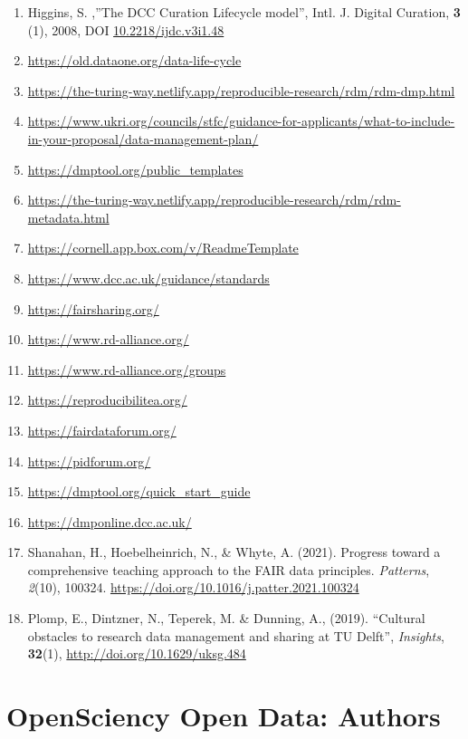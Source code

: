 \documentclass[
  letterpaper,
  DIV=11,
  numbers=noendperiod]{scrreport}
\providecommand{\tightlist}{%
  \setlength{\itemsep}{0pt}\setlength{\parskip}{0pt}}\usepackage{longtable,booktabs,array}
\begin{document}
\begin{enumerate}
\def\labelenumi{\arabic{enumi}.}
\tightlist
\item
  Higgins, S. ,''The DCC Curation Lifecycle model'', Intl. J. Digital
  Curation, \textbf{3} (1), 2008, DOI
  \href{https://doi.org/10.2218/ijdc.v3i1.48}{10.2218/ijdc.v3i1.48}
\item
  \href{https://fairsharing.org/}{https://old.dataone.org/data-life-cycle}
\item
  \url{https://the-turing-way.netlify.app/reproducible-research/rdm/rdm-dmp.html}
\item
  \url{https://www.ukri.org/councils/stfc/guidance-for-applicants/what-to-include-in-your-proposal/data-management-plan/}
\item
  \url{https://dmptool.org/public_templates}
\item
  \url{https://the-turing-way.netlify.app/reproducible-research/rdm/rdm-metadata.html}
\item
  \href{https://fairsharing.org/}{https://cornell.app.box.com/v/ReadmeTemplate}
\item
  \url{https://www.dcc.ac.uk/guidance/standards}
\item
  \url{https://fairsharing.org/}
\item
  \url{https://www.rd-alliance.org/}
\item
  \url{https://www.rd-alliance.org/groups}
\item
  \url{https://reproducibilitea.org/}
\item
  \url{https://fairdataforum.org/}
\item
  \url{https://pidforum.org/}
\item
  \url{https://dmptool.org/quick_start_guide}
\item
  \url{https://dmponline.dcc.ac.uk/}
\item
  Shanahan, H., Hoebelheinrich, N., \& Whyte, A. (2021). Progress toward
  a comprehensive teaching approach to the FAIR data principles.
  \emph{Patterns}, \emph{2}(10), 100324.
  \url{https://doi.org/10.1016/j.patter.2021.100324}
\item
  Plomp, E., Dintzner, N., Teperek, M. \& Dunning, A., (2019).
  ``Cultural obstacles to research data management and sharing at TU
  Delft'', \emph{Insights}, \textbf{32}(1),
  \url{http://doi.org/10.1629/uksg.484}
\end{enumerate}

\hypertarget{opensciency-open-data-authors}{%
\chapter{OpenSciency Open Data:
Authors}\label{opensciency-open-data-authors}}
\end{document}
